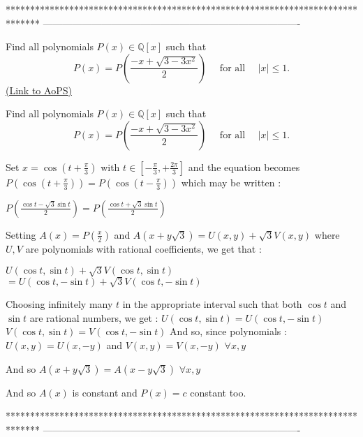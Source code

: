 *******************************************************************************
-------------------------------------------------------------------------------

\begin{problem}
	Find all polynomials $P(x)\in \mathbb Q[x]$ such that
\[P(x)=P\left(\frac{-x+\sqrt{3 -3x^2}}{2}\right) \quad \text{ for all } \quad |x| \le 1.\]
	\flushright \href{https://artofproblemsolving.com/community/c6h397760}{(Link to AoPS)}
\end{problem}



\begin{solution}
	\begin{tcolorbox}Find all polynomials $P(x)\in \mathbb Q[x]$ such that
\[P(x)=P\left(\frac{-x+\sqrt{3 -3x^2}}{2}\right) \quad \text{ for all } \quad |x| \le 1.\]\end{tcolorbox}
Set $x=\cos (t+\frac{\pi}3)$ with $t\in[-\frac{\pi}3,+\frac{2\pi}3]$ and the equation becomes $P(\cos (t+\frac{\pi}3))=P(\cos (t-\frac{\pi}3))$ which may be written :

$P(\frac{\cos t -\sqrt 3\sin t}2)=P(\frac{\cos t +\sqrt 3\sin t}2)$

Setting $A(x)=P(\frac x2)$ and $A(x+y\sqrt 3)=U(x,y)+\sqrt 3 V(x,y)$ where $U, V$ are polynomials with rational coefficients, we get that :

$U(\cos t,\sin t)+\sqrt 3 V(\cos t,\sin t)$ $=U(\cos t,-\sin t)+\sqrt 3 V(\cos t,-\sin t)$

Choosing infinitely many $t$ in the appropriate interval such that both $\cos t$ and $\sin t$ are rational numbers, we get :
$U(\cos t,\sin t)=U(\cos t,-\sin t)$
$V(\cos t,\sin t)=V(\cos t,-\sin t)$
And so, since polynomials : $U(x,y)=U(x,-y)$ and $V(x,y)=V(x,-y)$ $\forall x,y$

And so $A(x+y\sqrt 3)=A(x-y\sqrt 3)$ $\forall x,y$

And so $A(x)$ is constant and $\boxed{P(x)=c}$ constant too.
\end{solution}
*******************************************************************************
-------------------------------------------------------------------------------

